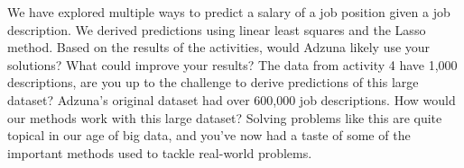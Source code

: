 \documentclass[12pt]{article}
\begin{document}
    We have explored multiple ways to predict a salary of a job position given
    a job description. We derived predictions using linear least squares and
    the Lasso method. Based on the results of the activities, would Adzuna
    likely use your solutions? What could improve your results? The data from
    activity 4 have 1,000 descriptions, are you up to the challenge to derive
    predictions of this large dataset? Adzuna's original dataset had over
    600,000 job descriptions. How would our methods work with this large
    dataset? Solving problems like this are quite topical in our age of big
    data, and you've now had a taste of some of the important methods used to
    tackle real-world problems.
\end{document}
